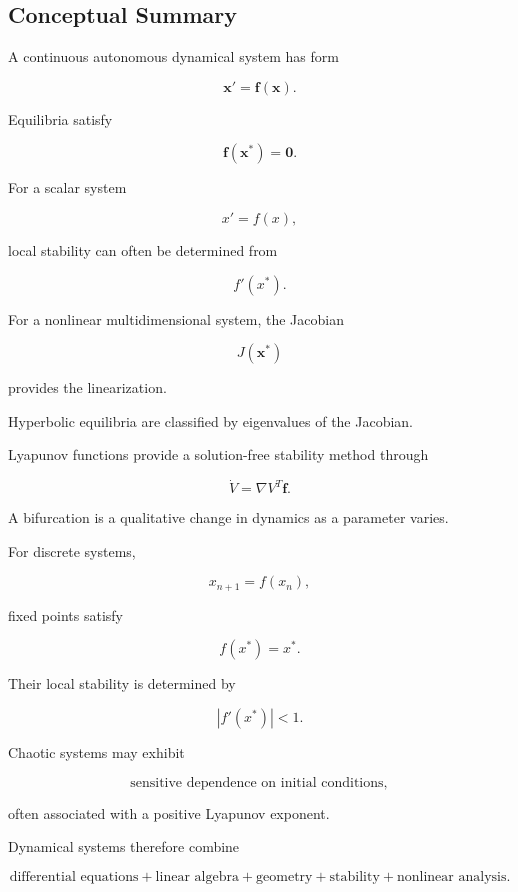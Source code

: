\subsection{Conceptual Summary}
\label{subsec:dynamical-systems-summary}

A continuous autonomous dynamical system has form

\[
\boxed{
\mathbf{x}'
=
\mathbf{f}(\mathbf{x}).
}
\]

Equilibria satisfy

\[
\boxed{
\mathbf{f}(\mathbf{x}^*)=\mathbf{0}.
}
\]

For a scalar system

\[
x'=f(x),
\]

local stability can often be determined from

\[
\boxed{
f'(x^*).
}
\]

For a nonlinear multidimensional system, the Jacobian

\[
\boxed{
J(\mathbf{x}^*)
}
\]

provides the linearization.

Hyperbolic equilibria are classified by eigenvalues of the Jacobian.

Lyapunov functions provide a solution-free stability method through

\[
\boxed{
\dot V
=
\nabla V^T\mathbf{f}.
}
\]

A bifurcation is a qualitative change in dynamics as a parameter varies.

For discrete systems,

\[
\boxed{
x_{n+1}=f(x_n),
}
\]

fixed points satisfy

\[
\boxed{
f(x^*)=x^*.
}
\]

Their local stability is determined by

\[
\boxed{
|f'(x^*)|<1.
}
\]

Chaotic systems may exhibit

\[
\boxed{
\text{sensitive dependence on initial conditions},
}
\]

often associated with a positive Lyapunov exponent.

Dynamical systems therefore combine

\[
\boxed{
\text{differential equations}
+
\text{linear algebra}
+
\text{geometry}
+
\text{stability}
+
\text{nonlinear analysis}.
}
\]

